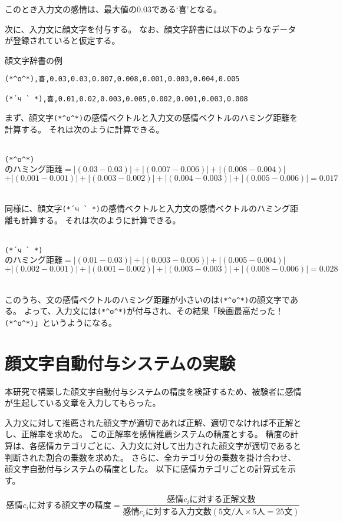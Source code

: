 \documentclass[11pt,a4j]{jsarticle}
\begin{document}
このとき入力文の感情は、最大値の0.03である`喜'となる。

次に、入力文に顔文字を付与する。
なお、顔文字辞書には以下のようなデータが登録されていると仮定する。

\begin{itembox}{顔文字辞書の例}
\begin{verbatim}
(*^o^*),喜,0.03,0.03,0.007,0.008,0.001,0.003,0.004,0.005

(*´ч ` *),喜,0.01,0.02,0.003,0.005,0.002,0.001,0.003,0.008
\end{verbatim}
\end{itembox}

まず、顔文字\verb|(*^o^*)|の感情ベクトルと入力文の感情ベクトルのハミング距離を計算する。
それは次のように計算できる。

~\\
\verb|(*^o^*)|$のハミング距離 = |(0.03-0.03)|+|(0.007-0.006)|+|(0.008-0.004)|$
  $+|(0.001-0.001)|+|(0.003-0.002)|+|(0.004-0.003)|+|(0.005-0.006)| = 0.017$

~\\
同様に、顔文字\verb|(*´ч ` *)|の感情ベクトルと入力文の感情ベクトルのハミング距離も計算する。
それは次のように計算できる。

~\\
  \verb|(*´ч ` *)|$のハミング距離 = |(0.01-0.03)|+|(0.003-0.006)|+|(0.005-0.004)|$
 $ +|(0.002-0.001)|+|(0.001-0.002)|+|(0.003-0.003)|+|(0.008-0.006)| = 0.028$

~\\
このうち、文の感情ベクトルのハミング距離が小さいのは\verb|(*^o^*)|の顔文字である。
よって、入力文には\verb|(*^o^*)|が付与され、その結果「映画最高だった！\verb|(*^o^*)|」というようになる。

\section{顔文字自動付与システムの実験}\label{sec:experiment}
本研究で構築した顔文字自動付与システムの精度を検証するため、被験者に感情が生起している文章を入力してもらった。

入力文に対して推薦された顔文字が適切であれば正解、適切でなければ不正解とし、正解率を求めた。
この正解率を感情推薦システムの精度とする。
精度の計算は、各感情カテゴリごとに、入力文に対して出力された顔文字が適切であると判断された割合の乗数を求めた。
さらに、全カテゴリ分の乗数を掛け合わせ、顔文字自動付与システムの精度とした。
以下に感情カテゴリごとの計算式を示す。

\[
  感情c_iに対する顔文字の精度=\frac{感情c_iに対する正解文数}{感情c_iに対する入力文数(5文/人 \times 5人 = 25文)}
\]
\end{document}

